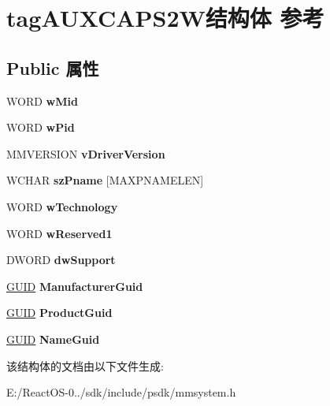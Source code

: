 \hypertarget{structtag_a_u_x_c_a_p_s2_w}{}\section{tag\+A\+U\+X\+C\+A\+P\+S2\+W结构体 参考}
\label{structtag_a_u_x_c_a_p_s2_w}
\subsection*{Public 属性}
\begin{DoxyCompactItemize}
\item 
\mbox{\label{structtag_a_u_x_c_a_p_s2_w_af0a31b3e0537d00eb93f5884298e8ffd}} 
W\+O\+RD {\bfseries w\+Mid}
\item 
\mbox{\label{structtag_a_u_x_c_a_p_s2_w_a4519fb5fdfd86d644ff75e8582fac3a5}} 
W\+O\+RD {\bfseries w\+Pid}
\item 
\mbox{\label{structtag_a_u_x_c_a_p_s2_w_ab3c5bd71748e2b8a50295b800224292f}} 
M\+M\+V\+E\+R\+S\+I\+ON {\bfseries v\+Driver\+Version}
\item 
\mbox{\label{structtag_a_u_x_c_a_p_s2_w_a5e936dc3e6bc58a702abdf24689aaf8b}} 
W\+C\+H\+AR {\bfseries sz\+Pname} \mbox{[}M\+A\+X\+P\+N\+A\+M\+E\+L\+EN\mbox{]}
\item 
\mbox{\label{structtag_a_u_x_c_a_p_s2_w_a4446f2fda09b6523fd4112fecfdc011a}} 
W\+O\+RD {\bfseries w\+Technology}
\item 
\mbox{\label{structtag_a_u_x_c_a_p_s2_w_aa11a4926010e151449f22670921df8af}} 
W\+O\+RD {\bfseries w\+Reserved1}
\item 
\mbox{\label{structtag_a_u_x_c_a_p_s2_w_ac62c107d1d3ccad3fcd09b2e2cdf2031}} 
D\+W\+O\+RD {\bfseries dw\+Support}
\item 
\mbox{\label{structtag_a_u_x_c_a_p_s2_w_aa0c861b2b2847a9c0d68e35b72827adc}} 
\hyperlink{interface_g_u_i_d}{G\+U\+ID} {\bfseries Manufacturer\+Guid}
\item 
\mbox{\label{structtag_a_u_x_c_a_p_s2_w_a97d2abe11805ad92abc730c06c8ea045}} 
\hyperlink{interface_g_u_i_d}{G\+U\+ID} {\bfseries Product\+Guid}
\item 
\mbox{\label{structtag_a_u_x_c_a_p_s2_w_a61a783c03c8050262a5941e40fc864c3}} 
\hyperlink{interface_g_u_i_d}{G\+U\+ID} {\bfseries Name\+Guid}
\end{DoxyCompactItemize}


该结构体的文档由以下文件生成\+:\begin{DoxyCompactItemize}
\item 
E\+:/\+React\+O\+S-\/0../sdk/include/psdk/mmsystem.\+h\end{DoxyCompactItemize}
